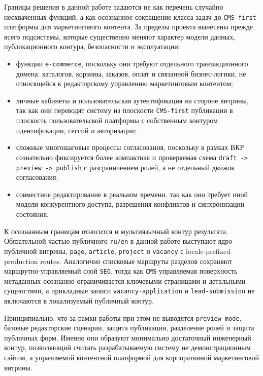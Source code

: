 Границы решения в данной работе задаются не как перечень случайно неохваченных функций,
а как осознанное сокращение класса задач до \texttt{CMS-first} платформы для
маркетингового контента. За пределы проекта вынесены прежде всего подсистемы, которые
существенно меняют характер модели данных, публикационного контура, безопасности и
эксплуатации:
\begin{itemize}
  \item функции \texttt{e-commerce}, поскольку они требуют отдельного транзакционного
  домена: каталогов, корзины, заказов, оплат и связанной бизнес-логики, не относящейся к
  редакторскому управлению маркетинговым контентом;
  \item личные кабинеты и пользовательская аутентификация на стороне витрины, так как они
  переводят систему из плоскости \texttt{CMS-first} публикации в плоскость
  пользовательской платформы с собственным контуром идентификации, сессий и авторизации;
  \item сложные многошаговые процессы согласования, поскольку в рамках ВКР сознательно
  фиксируется более компактная и проверяемая схема \texttt{draft -> preview -> publish} с
  разграничением ролей, а не отдельный движок согласования;
  \item совместное редактирование в реальном времени, так как оно требует иной модели
  конкурентного доступа, разрешения конфликтов и синхронизации состояния.
\end{itemize}

К осознанным границам относится и мультиязычный контур результата. Обязательной частью
публичного \texttt{ru/en} в данной работе выступают ядро публичной витрины, \texttt{page},
\texttt{article}, \texttt{project} и \texttt{vacancy} с locale-prefixed production
routes. Аналогично списковые маршруты разделов сохраняют маршрутно-управляемый слой
\texttt{SEO}, тогда как \texttt{CMS}-управляемая поверхность метаданных осознанно
ограничивается ключевыми страницами и детальными сущностями, а прикладные записи
\texttt{vacancy-application} и \texttt{lead-submission} не включаются в локализуемый
публичный контур.

Принципиально, что за рамки работы при этом не выводятся \texttt{preview mode}, базовые
редакторские сценарии, защита публикации, разделение ролей и защита публичных форм.
Именно они образуют минимально достаточный инженерный контур, позволяющий считать
разрабатываемую систему не демонстрационным сайтом, а управляемой контентной платформой
для корпоративной маркетинговой витрины.

